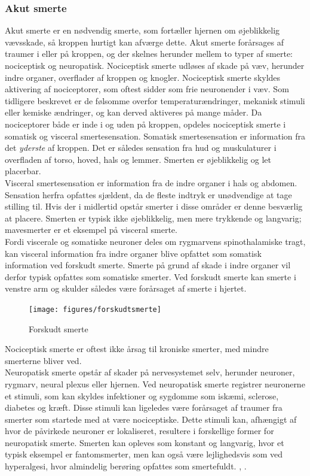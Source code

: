 \subsubsection{Akut smerte}
Akut smerte er en nødvendig smerte, som fortæller hjernen om øjeblikkelig vævsskade, så kroppen hurtigt kan afværge dette. Akut smerte forårsages af traumer i eller på kroppen, og der skelnes herunder mellem to typer af smerte: nociceptisk og neuropatisk. Nociceptisk smerte udløses af skade på væv, herunder indre organer, overflader af kroppen og knogler. Nociceptisk smerte skyldes aktivering af nociceptorer, som oftest sidder som frie neuronender i væv. Som tidligere beskrevet er de følsomme overfor temperaturændringer, mekanisk stimuli eller kemiske ændringer, og kan derved aktiveres på mange måder. Da nociceptorer både er inde i og uden på kroppen, opdeles nociceptisk smerte i somatisk og visceral smertesensation. Somatisk smertesensation er information fra det \textit{yderste} af kroppen. Det er således sensation fra hud og muskulaturer i overfladen af torso, hoved, hals og lemmer. \citep{Martini} Smerten er øjeblikkelig og let placerbar. \\
Visceral smertesensation er information fra de indre organer i hals og abdomen. Sensation herfra opfattes sjældent, da de fleste indtryk er unødvendige at tage stilling til. Hvis der i midlertid opstår smerter i disse områder er denne besværlig at placere. Smerten er typisk ikke øjeblikkelig, men mere trykkende og langvarig; mavesmerter er et eksempel på visceral smerte. \\
Fordi viscerale og somatiske neuroner deles om rygmarvens spinothalamiske tragt, kan visceral information fra indre organer blive opfattet som somatisk information ved forskudt smerte. Smerte på grund af skade i indre organer vil derfor typisk opfattes som somatiske smerter. Ved forskudt smerte kan smerte i venstre arm og skulder således være forårsaget af smerte i hjertet.

\begin{figure}[H]
	\caption{Forskudt smerte}
	\label{forskudtsmerte}
	\centering
	\texttt{[image: figures/forskudtsmerte]}
	\flushleft
	\textit{\citep{Martini}}
\end{figure}


Nociceptisk smerte er oftest ikke årsag til kroniske smerter, med mindre smerterne bliver ved.\\ 
Neuropatisk smerte opstår af skader på nervesystemet selv, herunder neuroner, rygmarv, neural plexus eller hjernen. 
Ved neuropatisk smerte registrer neuronerne et stimuli, som kan skyldes infektioner og sygdomme som iskæmi, sclerose, diabetes og kræft. Disse stimuli kan ligeledes være forårsaget af traumer fra smerter som startede med at være nociceptiske. Dette stimuli kan, afhængigt af hvor de påvirkede neuroner er lokaliseret, resultere i forskellige former for neuropatisk smerte. Smerten kan opleves som konstant og langvarig, hvor et typisk eksempel er fantomsmerter, men kan også være lejlighedsvis som ved hyperalgesi, hvor almindelig berøring opfattes som smertefuldt. \citep{Giangregorio1997}, \citep{Carmon}.

